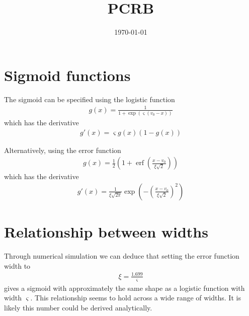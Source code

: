 \documentclass{article}
\title{PCRB}
\date{\today}
\DeclareMathOperator*{\erf}{erf}
\begin{document}
\section{Sigmoid functions}

The sigmoid can be specified using the logistic function
\begin{align}
	g(x) = \frac{1}{1 + \exp(\varsigma(v_0 - x))}
\end{align}
which has the derivative
\begin{align}
	g'(x) = \varsigma g(x)(1 - g(x))
\end{align}

Alternatively, using the error function
\begin{align}
	g(x) = \frac{1}{2}\left( 1 + \erf\left( \frac{x - v_0}{\xi\sqrt{2}}\right)\right)
\end{align}
which has the derivative
\begin{align}
	g'(x) = \frac{1}{\xi\sqrt{2\pi}} \exp\left(-\left(\frac{x - v_0}{\xi\sqrt{2}}\right)^2 \right) 
\end{align}

\section{Relationship between widths}

Through numerical simulation we can deduce that setting the error function width to
\begin{align}
	\xi = \frac{1.699}{\varsigma}
\end{align}
gives a sigmoid with approximately the same shape as a logistic function with width $\varsigma$. This relationship seems to hold across a wide range of widths. It is likely this number could be derived analytically.


% 
\end{document}
